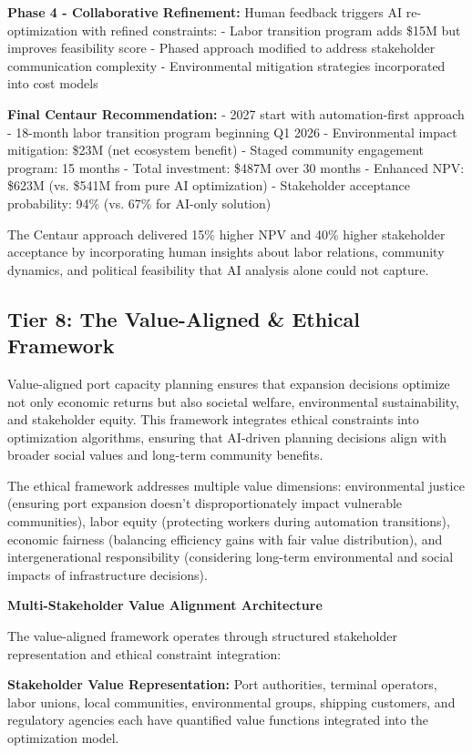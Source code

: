 \documentclass{article}
\begin{document}
\textbf{Phase 4 - Collaborative Refinement:}
Human feedback triggers AI re-optimization with refined constraints:
- Labor transition program adds \$15M but improves feasibility score
- Phased approach modified to address stakeholder communication complexity
- Environmental mitigation strategies incorporated into cost models

\textbf{Final Centaur Recommendation:}
- 2027 start with automation-first approach
- 18-month labor transition program beginning Q1 2026
- Environmental impact mitigation: \$23M (net ecosystem benefit)
- Staged community engagement program: 15 months
- Total investment: \$487M over 30 months
- Enhanced NPV: \$623M (vs. \$541M from pure AI optimization)
- Stakeholder acceptance probability: 94\% (vs. 67\% for AI-only solution)

The Centaur approach delivered 15\% higher NPV and 40\% higher stakeholder acceptance by incorporating human insights about labor relations, community dynamics, and political feasibility that AI analysis alone could not capture.

\subsection{Tier 8: The Value-Aligned \& Ethical Framework}

Value-aligned port capacity planning ensures that expansion decisions optimize not only economic returns but also societal welfare, environmental sustainability, and stakeholder equity. This framework integrates ethical constraints into optimization algorithms, ensuring that AI-driven planning decisions align with broader social values and long-term community benefits.

The ethical framework addresses multiple value dimensions: environmental justice (ensuring port expansion doesn't disproportionately impact vulnerable communities), labor equity (protecting workers during automation transitions), economic fairness (balancing efficiency gains with fair value distribution), and intergenerational responsibility (considering long-term environmental and social impacts of infrastructure decisions).

\textbf{Multi-Stakeholder Value Alignment Architecture}

The value-aligned framework operates through structured stakeholder representation and ethical constraint integration:

\textbf{Stakeholder Value Representation:} Port authorities, terminal operators, labor unions, local communities, environmental groups, shipping customers, and regulatory agencies each have quantified value functions integrated into the optimization model.
\end{document}
